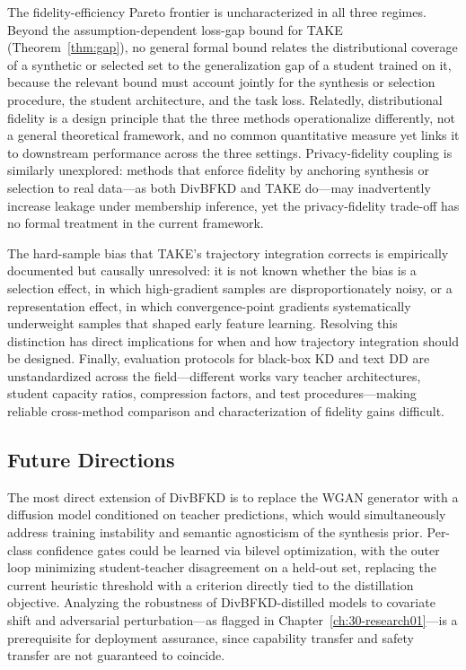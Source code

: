 \begin{foldable}
  The fidelity-efficiency Pareto frontier is uncharacterized in all three regimes.
  Beyond the assumption-dependent loss-gap bound for TAKE (Theorem~\ref{thm:gap}), no general formal bound relates the distributional coverage of a synthetic or selected set to the generalization gap of a student trained on it, because the relevant bound must account jointly for the synthesis or selection procedure, the student architecture, and the task loss.
  Relatedly, distributional fidelity is a design principle that the three methods operationalize differently, not a general theoretical framework, and no common quantitative measure yet links it to downstream performance across the three settings.
  Privacy-fidelity coupling is similarly unexplored: methods that enforce fidelity by anchoring synthesis or selection to real data---as both DivBFKD and TAKE do---may inadvertently increase leakage under membership inference, yet the privacy-fidelity trade-off has no formal treatment in the current framework.
\end{foldable}

\begin{foldable}
  The hard-sample bias that TAKE's trajectory integration corrects is empirically documented but causally unresolved: it is not known whether the bias is a selection effect, in which high-gradient samples are disproportionately noisy, or a representation effect, in which convergence-point gradients systematically underweight samples that shaped early feature learning.
  Resolving this distinction has direct implications for when and how trajectory integration should be designed.
  Finally, evaluation protocols for black-box \ac{KD} and text \ac{DD} are unstandardized across the field---different works vary teacher architectures, student capacity ratios, compression factors, and test procedures---making reliable cross-method comparison and characterization of fidelity gains difficult.
\end{foldable}

\subsection{Future Directions} \label{subsec:62-conclusion-future-directions}

\begin{foldable}
  The most direct extension of DivBFKD is to replace the WGAN generator with a diffusion model conditioned on teacher predictions, which would simultaneously address training instability and semantic agnosticism of the synthesis prior.
  Per-class confidence gates could be learned via bilevel optimization, with the outer loop minimizing student-teacher disagreement on a held-out set, replacing the current heuristic threshold with a criterion directly tied to the distillation objective.
  Analyzing the robustness of DivBFKD-distilled models to covariate shift and adversarial perturbation---as flagged in Chapter~\ref{ch:30-research01}---is a prerequisite for deployment assurance, since capability transfer and safety transfer are not guaranteed to coincide.
\end{foldable}

